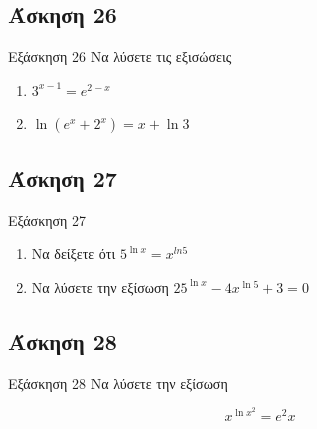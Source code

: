 \documentclass[greek]{beamer}
\begin{document}
\subsection{Άσκηση 26}
\begin{frame}[label=Άσκηση26,t]{Εξάσκηση 26}
  Να λύσετε τις εξισώσεις
  \begin{enumerate}
    \item<1-> $3^{x-1}=e^{2-x}$
    \item<2-> $\ln (e^x+2^x)=x+\ln 3$
  \end{enumerate}

\end{frame}

\subsection{Άσκηση 27}
\begin{frame}[label=Άσκηση27,t]{Εξάσκηση 27}
  \begin{enumerate}
    \item<1-> Να δείξετε ότι $5^{\ln x}=x^{ln 5}$
    \item<2-> Να λύσετε την εξίσωση $25^{\ln x}-4x^{\ln 5}+3=0$
  \end{enumerate}

\end{frame}

\subsection{Άσκηση 28}
\begin{frame}[label=Άσκηση28,t]{Εξάσκηση 28}
  Να λύσετε την εξίσωση

  $$x^{\ln x^2}=e^2x$$

\end{frame}
\end{document}
